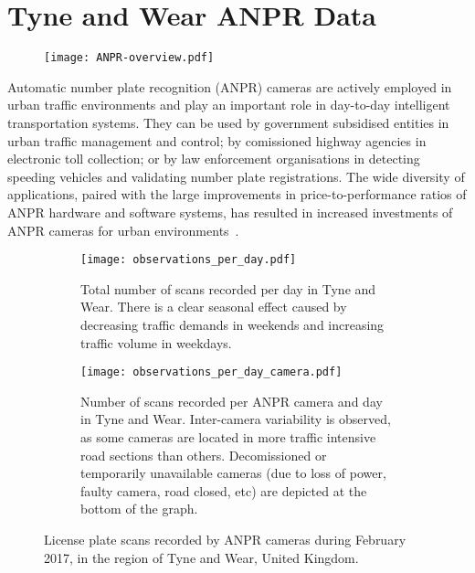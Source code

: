 \section{Tyne and Wear ANPR Data}\label{s.ncl}

\begin{figure}[t]
\centering
\texttt{[image: ANPR-overview.pdf]}
\caption{}
\label{fig:anpr-overview}
\end{figure}

Automatic number plate recognition (ANPR) cameras are actively employed in urban traffic environments and play an important role in day-to-day intelligent transportation systems. They can be used by government subsidised entities in urban traffic management and control; by comissioned highway agencies in electronic toll collection; or by law enforcement organisations in detecting speeding vehicles and validating number plate registrations. The wide diversity of applications, paired with the large improvements in price-to-performance ratios of ANPR hardware and software systems, has resulted in increased investments of ANPR cameras for urban environments~\cite{EvolutionUTMC2013, SurveyITS2011}.

\begin{figure*}[t]
\centering
\begin{subfigure}[t]{.48\textwidth}
  \centering
  \texttt{[image: observations\_per\_day.pdf]}
  \caption{Total number of scans recorded per day in Tyne and Wear. There is a clear seasonal effect caused by decreasing traffic demands in weekends and increasing traffic volume in weekdays.}
  \label{fig:observations-per-day}
\end{subfigure}\hfill
\begin{subfigure}[t]{.48\textwidth}
  \centering
  \texttt{[image: observations\_per\_day\_camera.pdf]}
  \caption{Number of scans recorded per ANPR camera and day in Tyne and Wear. Inter-camera variability is observed, as some cameras are located in more traffic intensive road sections than others. Decomissioned or temporarily unavailable cameras (due to loss of power, faulty camera, road closed, etc) are depicted at the bottom of the graph.}
  \label{fig:observations-per-camera-day}
\end{subfigure}
\caption{License plate scans recorded by ANPR cameras during February 2017, in the region of Tyne and Wear, United Kingdom.}
\label{fig:time-series}
\end{figure*}

